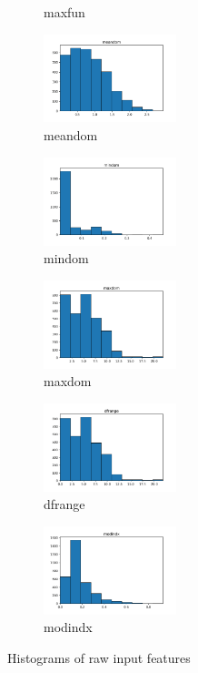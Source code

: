 \documentclass[a4paper]{article}    %
\begin{document}
\begin{figure}[H]
\begin{subfigure}{0.32\textwidth}
        \caption{maxfun}
        \label{fig:sub_raw_14}
    \end{subfigure}\hfill
    \begin{subfigure}{0.32\textwidth}
        \centering
        \includegraphics[width=3.85cm]{raw_14_meandom}
        \caption{meandom}
        \label{fig:sub_raw_15}
    \end{subfigure}\hfill
    \begin{subfigure}{0.32\textwidth}
        \centering
        \includegraphics[width=3.85cm]{raw_15_mindom}
        \caption{mindom}
        \label{fig:sub_raw_16}
    \end{subfigure}\hfill
    \begin{subfigure}{0.32\textwidth}
        \centering
        \includegraphics[width=3.85cm]{raw_16_maxdom}
        \caption{maxdom}
        \label{fig:sub_raw_17}
    \end{subfigure}\hfill
    \begin{subfigure}{0.32\textwidth}
        \centering
        \includegraphics[width=3.85cm]{raw_17_dfrange}
        \caption{dfrange}
        \label{fig:sub_raw_18}
    \end{subfigure}\hfill
    \begin{subfigure}{0.32\textwidth}
        \centering
        \includegraphics[width=3.85cm]{raw_18_modindx}
        \caption{modindx}
        \label{fig:sub_raw_19}
    \end{subfigure}
    \caption{Histograms of raw input features}
    \label{fig:pre-ex1-raw_histograms}
\end{figure}
\end{document}
